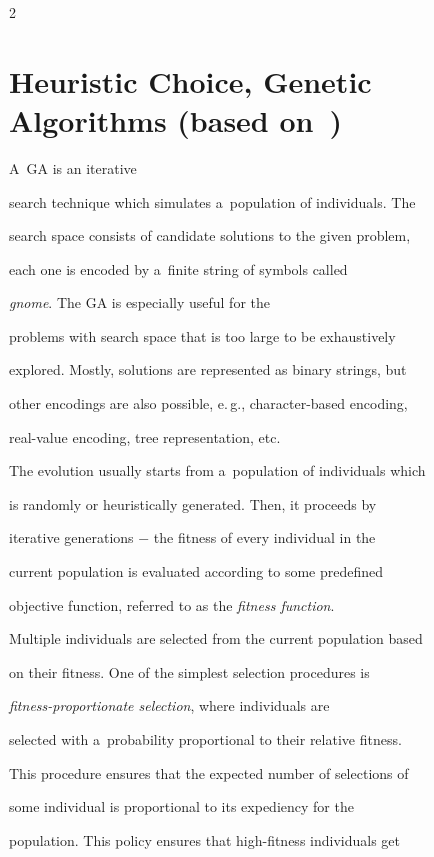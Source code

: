\begin{multicols}{2}
\section{Heuristic Choice, Genetic Algorithms (based on~\cite{Sipper1996})} \label{s:GA}





\noindent


A~GA is an iterative


search technique which simulates a~population of individuals. The


search space consists of candidate solutions to the given problem,


each one is encoded by a~finite string of symbols called


\textit{gnome}. The GA is especially useful for the


problems with search space that is too large to be exhaustively


explored. Mostly, solutions are represented as binary strings, but


other encodings are also possible, e.\,g., character-based encoding,


real-value encoding, tree representation, etc.





The evolution usually starts from a~population of individuals which


is randomly or heuristically generated. Then, it proceeds by


iterative generations $-$ the fitness of every individual in the


current population is evaluated according to some predefined


objective function, referred to as the \textit{fitness function}.


Multiple individuals are selected from the current population based


on their fitness. One of the simplest selection procedures is


\textit{fitness-proportionate selection}, where individuals are


selected with a~probability proportional to their relative fitness.


This procedure ensures that the expected number of selections of


some individual is proportional to its expediency for the


population. This policy ensures that high-fitness individuals get



\end{multicols}
